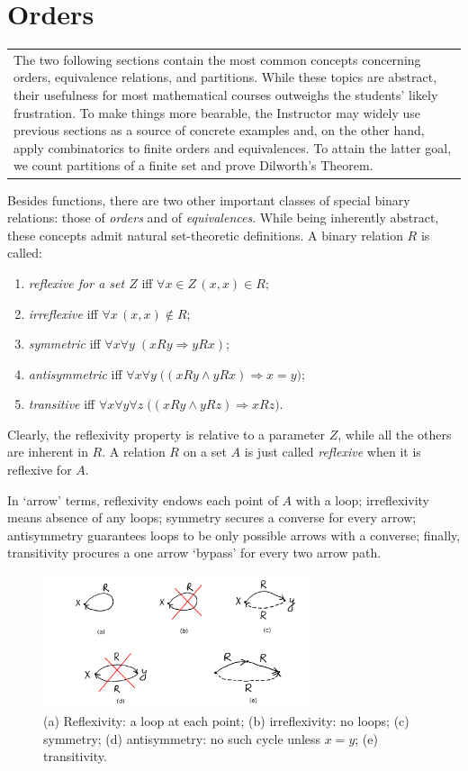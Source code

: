 \documentclass[12pt,notitlepage]{article}
\theoremstyle{plain}
\theoremstyle{definition}
\theoremstyle{plain}
\newcommand{\1}{\mathbf{1}}
\newcommand{\0}{\mathbf{0}}
\newcommand{\ply}{\Longrightarrow}
\newcommand{\mcomm}[1]{
\medskip\noindent\begin{tabular}{| l}
\parbox{0.99\textwidth}{{\small
#1 }}\end{tabular}
\smallskip}
\begin{document}
\newpage
\section{Orders}\label{sect:orders}
\mcomm{The two following  sections contain the most common concepts concerning orders, equivalence relations, and partitions. While these topics are abstract, their usefulness for most mathematical courses outweighs the students' likely frustration. To make things more bearable, the Instructor may widely use previous sections as a source of concrete examples and, on the other hand, apply combinatorics to finite orders and equivalences. To attain the latter goal, we count partitions of a finite set and prove Dilworth's Theorem.}


Besides functions, there are two other important classes of special binary relations: those of \emph{orders} and of \emph{equivalences}. While being inherently abstract, these concepts admit natural set-theoretic definitions. A binary relation $R$ is called:
\begin{enumerate}
\item \emph{reflexive for a set $Z$} iff $\forall x \in Z\, (x,x) \in R$;
\item \emph{irreflexive} iff $\forall x\, (x,x) \notin R$;
\item \emph{symmetric} iff $\forall x \forall y\; (x R y \ply y R x)$;
\item \emph{antisymmetric} iff $\forall x \forall y\; \bigl( (x R y \wedge y R x) \ply x = y \bigr)$;
\item \emph{transitive} iff $\forall x \forall y \forall z\; \bigl( (x R y \wedge y R z) \ply x R z \bigr)$.
\end{enumerate}
Clearly, the reflexivity property is relative to a parameter $Z$, while all the others are inherent in $R$. A relation $R$ on a set $A$ is just called \emph{reflexive} when it is reflexive for $A$.

In `arrow' terms, reflexivity endows each point of $A$ with a loop; irreflexivity means absence of any loops; symmetry secures a converse for every arrow; antisymmetry guarantees loops to be only possible arrows with a converse; finally, transitivity procures a one arrow `bypass' for every two arrow path.

\begin{figure}[h]
\centering
\includegraphics*[width=0.7\textwidth]{ord_refl.pdf}
\caption{(a) Reflexivity: a loop at each point; (b) irreflexivity: no loops; (c) symmetry; (d) antisymmetry: no such cycle unless $x = y$; (e) transitivity.}
\end{figure}
\end{document}
